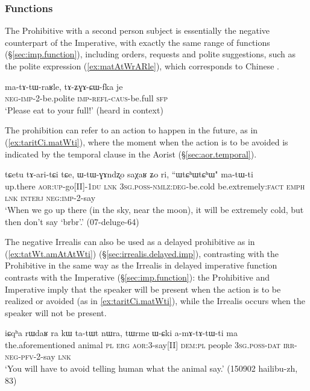 \subsubsection{Functions} \label{sec:prohib.function}
The Prohibitive with a second person subject is essentially the negative counterpart of the Imperative, with exactly the same range of functions (§\ref{sec:imp.function}), including orders,  requests and polite suggestions, such as the polite expression  (\ref{ex:matAtWrARle}), which corresponds to Chinese .

\begin{exe}
\ex  \label{ex:matAtWrARle}
\gll ma-tɤ-tɯ-raʁle, tɤ-ʑɣɤ-ɕɯ-fka je\\
\textsc{neg}-\textsc{imp}-2-be.polite \textsc{imp}-\textsc{refl}-\textsc{caus}-be.full \textsc{sfp} \\
\glt `Please eat to your full!' (heard in context)
\end{exe}

The prohibition can refer to an action to happen in the future, as in (\ref{ex:taritCi.matWti}), where the moment when the action is to be avoided is indicated by the temporal clause in the Aorist (§\ref{sec:aor.temporal}).

\begin{exe}
\ex  \label{ex:taritCi.matWti}
\gll tɕetu tɤ-ari-tɕi tɕe, ɯ-tɯ-ɣɤndʐo saχaʁ ʑo ri, ``ɯtɕʰɯtɕʰɯ" ma-tɯ-ti \\
up.there \textsc{aor}:\textsc{up}-go[II]-\textsc{1du} \textsc{lnk} \textsc{3sg}.\textsc{poss}-\textsc{nmlz}:\textsc{deg}-be.cold be.extremely:\textsc{fact} \textsc{emph} \textsc{lnk} \textsc{interj} \textsc{neg}:\textsc{imp}-2-say \\
\glt `When we go up there (in the sky, near the moon), it will be extremely cold, but then don't say `brbr'.' (07-deluge-64)
\end{exe}

The negative Irrealis can also be used as a delayed prohibitive as in (\ref{ex:tatWt.amAtAtWti}) (§\ref{sec:irrealis.delayed.imp}), contrasting with the Prohibitive in the same way as the Irrealis in delayed imperative function contrasts with the Imperative (§\ref{sec:imp.function}): the Prohibitive and Imperative imply that the speaker will be present when the action is to be realized or avoided (as in \ref{ex:taritCi.matWti}), while the Irrealis occurs when the speaker will not be present. 

\begin{exe}
\ex  \label{ex:tatWt.amAtAtWti}
\gll iɕqʰa rɯdaʁ ra kɯ ta-tɯt nɯra, tɯrme ɯ-ɕki a-mɤ-tɤ-tɯ-ti ma \\
the.aforementioned animal \textsc{pl} \textsc{erg} \textsc{aor}:3\flobv{}-say[II] \textsc{dem}:\textsc{pl} people \textsc{3sg}.\textsc{poss}-\textsc{dat} \textsc{irr}-\textsc{neg}-\textsc{pfv}-2-say \textsc{lnk} \\
\glt `You will have to avoid telling human what the animal say.' (150902 hailibu-zh, 83)
\end{exe}

